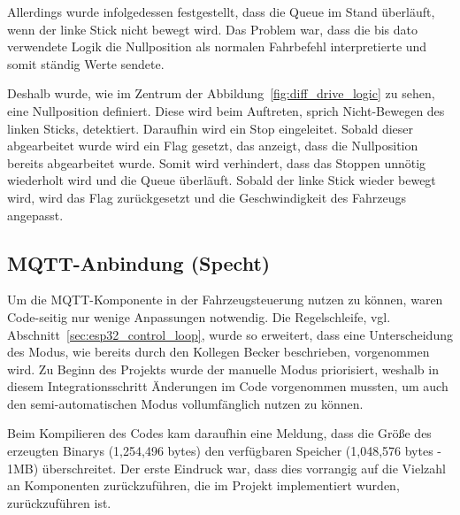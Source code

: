 Allerdings wurde infolgedessen festgestellt, dass die Queue im Stand überläuft, wenn der linke Stick nicht bewegt wird. Das Problem war, dass die bis dato verwendete Logik die Nullposition als normalen Fahrbefehl interpretierte und somit ständig Werte sendete. \newline

Deshalb wurde, wie im Zentrum der Abbildung~\ref{fig:diff_drive_logic} zu sehen, eine Nullposition definiert. Diese wird beim Auftreten, sprich Nicht-Bewegen des linken Sticks, detektiert. Daraufhin wird ein Stop eingeleitet. Sobald dieser abgearbeitet wurde wird ein Flag gesetzt, das anzeigt, dass die Nullposition bereits abgearbeitet wurde. Somit wird verhindert, dass das Stoppen unnötig wiederholt wird und die Queue überläuft. Sobald der linke Stick wieder bewegt wird, wird das Flag zurückgesetzt und die Geschwindigkeit des Fahrzeugs angepasst. \newline

\subsection{MQTT-Anbindung (Specht)}

Um die MQTT-Komponente in der Fahrzeugsteuerung nutzen zu können, waren Code-seitig nur wenige Anpassungen notwendig. Die Regelschleife, vgl. Abschnitt~\ref{sec:esp32_control_loop}, wurde so erweitert, dass eine Unterscheidung des Modus, wie bereits durch den Kollegen Becker beschrieben, vorgenommen wird. Zu Beginn des Projekts wurde der manuelle Modus priorisiert, weshalb in diesem Integrationsschritt Änderungen im Code vorgenommen mussten, um auch den semi-automatischen Modus vollumfänglich nutzen zu können. \newline

Beim Kompilieren des Codes kam daraufhin eine Meldung, dass die Größe des erzeugten Binarys (1,254,496 bytes) den verfügbaren Speicher (1,048,576 bytes - 1MB) überschreitet. Der erste Eindruck war, dass dies vorrangig auf die Vielzahl an Komponenten zurückzuführen, die im Projekt implementiert wurden, zurückzuführen ist.

